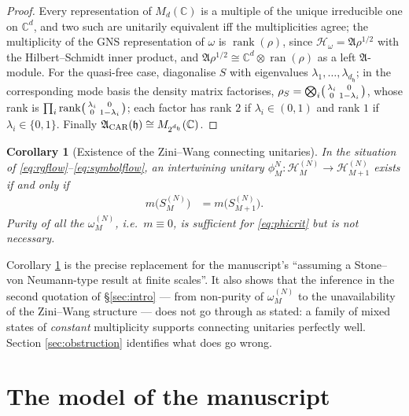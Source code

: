 \documentclass[11pt,a4paper]{article}
\newtheorem{cor}[thm]{Corollary}
\theoremstyle{definition}
\newcommand{\fA}{\mathfrak{A}}
\newcommand{\fh}{\mathfrak{h}}
\newcommand{\cH}{\mathcal{H}}
\newcommand{\1}{\mathds{1}}
\newcommand{\CAR}{\textup{CAR}}
\newcommand{\ran}{\operatorname{ran}}
\newcommand{\rank}{\operatorname{rank}}
\newcommand{\C}{\mathbb{C}}
\begin{document}
\begin{proof}
Every representation of $M_{d}(\C)$ is a multiple of the unique irreducible one on $\C^{d}$, and two
such are unitarily equivalent iff the multiplicities agree; the multiplicity of the GNS
representation of $\omega$ is $\rank(\rho)$, since $\cH_{\omega}=\fA\rho^{1/2}$ with the
Hilbert--Schmidt inner product, and $\fA\rho^{1/2}\cong\C^{d}\otimes\ran(\rho)$ as a left
$\fA$-module. For the quasi-free case, diagonalise $S$ with eigenvalues $\lambda_{1},\dots,
\lambda_{d_{\fh}}$; in the corresponding mode basis the density matrix factorises,
$\rho_{S}=\bigotimes_{i}\begin{psmallmatrix}\lambda_{i}&0\\0&1-\lambda_{i}\end{psmallmatrix}$, whose
rank is $\prod_{i}\rank\begin{psmallmatrix}\lambda_{i}&0\\0&1-\lambda_{i}\end{psmallmatrix}$; each
factor has rank $2$ if $\lambda_{i}\in(0,1)$ and rank $1$ if $\lambda_{i}\in\{0,1\}$. Finally
$\fA_{\CAR}(\fh)\cong M_{2^{d_{\fh}}}(\C)$.
\end{proof}

\begin{cor}[Existence of the Zini--Wang connecting unitaries]
\label{cor:phi}
In the situation of \eqref{eq:rgflow}--\eqref{eq:symbolflow}, an intertwining unitary
$\phi^{N}_{M}:\cH^{(N)}_{M}\rightarrow\cH^{(N)}_{M+1}$ exists if and only if
\begin{align}
\label{eq:phicrit}
m\big(S^{(N)}_{M}\big) & = m\big(S^{(N)}_{M+1}\big).
\end{align}
Purity of all the $\omega^{(N)}_{M}$, i.e.~$m\equiv0$, is sufficient for \eqref{eq:phicrit} but is
\emph{not} necessary.
\end{cor}

Corollary \ref{cor:phi} is the precise replacement for the manuscript's ``assuming a Stone--von
Neumann-type result at finite scales''. It also shows that the inference in the second quotation of
\S\ref{sec:intro} --- from non-purity of $\omega^{(N)}_{M}$ to the unavailability of the Zini--Wang
structure --- does not go through as stated: a family of mixed states of \emph{constant}
multiplicity supports connecting unitaries perfectly well. Section \ref{sec:obstruction} identifies
what does go wrong.

\section{The model of the manuscript}
\label{sec:model}
\end{document}
